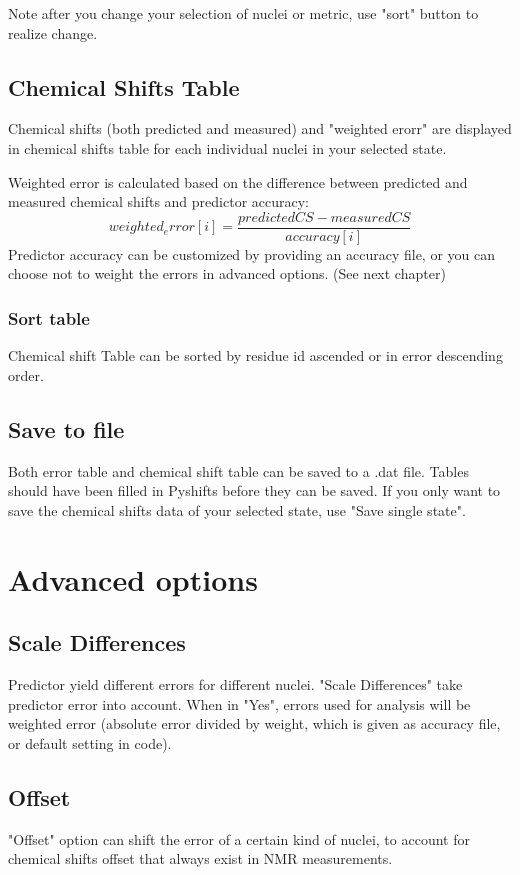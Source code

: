 \documentclass{article}
\begin{document}
Note after you change your selection of nuclei or metric, use "sort" button to realize change.

\subsection{Chemical Shifts Table}
Chemical shifts (both predicted and measured) and "weighted erorr" are displayed in chemical shifts table for each individual nuclei in your selected state. 

Weighted error is calculated based on the difference between predicted and measured chemical shifts and predictor accuracy:
$$weighted_error[i] = \frac{predictedCS-measuredCS}{accuracy[i]}$$
Predictor accuracy can be customized by providing an accuracy file, or you can choose not to weight the errors in advanced options. (See next chapter)
\subsubsection{Sort table}
Chemical shift Table can be sorted by residue id ascended or in error descending order.

\subsection{Save to file}
Both error table and chemical shift table can be saved to a .dat file. Tables should have been filled in Pyshifts before they can be saved. If you only want to save the chemical shifts data of your selected state, use "Save single state".


\newpage
\section{Advanced options}
\subsection{Scale Differences}
Predictor yield different errors for different nuclei. "Scale Differences" take predictor error into account. When in "Yes", errors used for analysis will be weighted error (absolute error divided by weight, which is given as accuracy file, or default setting in code).
\subsection{Offset}
"Offset" option can shift the error of a certain kind of nuclei, to account for chemical shifts offset that always exist in NMR measurements.
\end{document}
